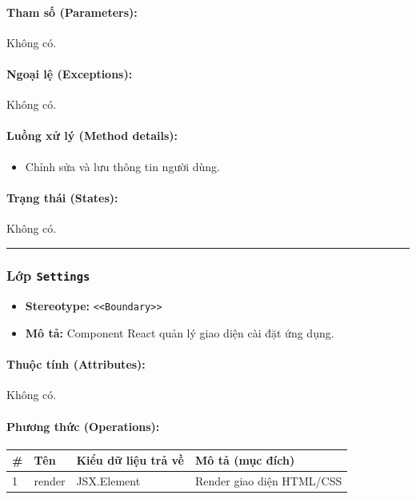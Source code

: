 \documentclass[12pt,a4paper]{article}
\begin{document}
\paragraph{Tham số (Parameters):}
Không có.

\paragraph{Ngoại lệ (Exceptions):}
Không có.

\paragraph{Luồng xử lý (Method details):}
\begin{itemize}[leftmargin=*]
    \item Chỉnh sửa và lưu thông tin người dùng.
\end{itemize}


\paragraph{Trạng thái (States):}
Không có.

\vskip 0.5cm
\noindent\rule{\textwidth}{0.5pt}
\vskip 0.5cm

\subsubsection{Lớp \texttt{Settings}}

\begin{itemize}[leftmargin=*]
    \item \textbf{Stereotype:} \texttt{\textless{}\textless{}Boundary\textgreater{}\textgreater{}}
    \item \textbf{Mô tả:} Component React quản lý giao diện cài đặt ứng dụng.
\end{itemize}

\paragraph{Thuộc tính (Attributes):}
Không có.

\paragraph{Phương thức (Operations):}
\begin{longtable}{|p{0.6cm}|p{5.0cm}|p{2.8cm}|p{5.4cm}|}
\hline
\textbf{\#} & \textbf{Tên} & \textbf{Kiểu dữ liệu trả về} & \textbf{Mô tả (mục đích)} \\ \hline
\endhead
1 & render & JSX.Element & Render giao diện HTML/CSS \\ \hline
\end{longtable}
\end{document}
